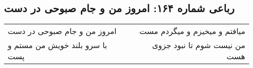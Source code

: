 \begin{center}
\section*{رباعی شماره ۱۶۴: امروز من و جام صبوحی در دست}
\label{sec:0164}
\begin{longtable}{l p{0.5cm} r}
امروز من و جام صبوحی در دست
&&
میافتم و میخیزم و میگردم مست
\\
با سرو بلند خویش من مستم و پست
&&
من نیست شوم تا نبود جزوی هست
\\
\end{longtable}
\end{center}
